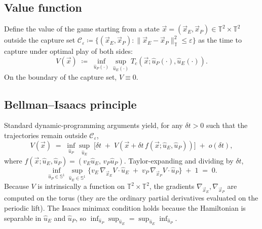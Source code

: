 \documentclass[11pt]{article}
\newcommand{\xE}{\vec{x}_E}
\newcommand{\xP}{\vec{x}_P}
\newcommand{\uE}{\hat{u}_E}
\newcommand{\uP}{\hat{u}_P}
\newcommand{\TT}{\mathbb{T}^{2}}
\begin{document}
\subsection{Value function}
Define the value of the game starting from a state
$\vec{x} = (\xE,\xP)\in\TT\times\TT$ outside the capture set
$\mathcal{C}_\varepsilon\coloneqq \{(\xE,\xP):\|\xE-\xP\|_\TT\le\varepsilon\}$
as the time to capture under optimal play of both sides:
\begin{equation}
V(\vec{x})
\;\coloneqq\;
\inf_{\uP(\cdot)} \sup_{\uE(\cdot)}
T_c(\vec{x};\uP(\cdot),\uE(\cdot)).
\end{equation}
On the boundary of the capture set, $V \equiv 0$.

\subsection{Bellman--Isaacs principle}
Standard dynamic-programming arguments \citep{evans1984differential,
basar1999dynamic} yield, for any $\delta t>0$ such that the trajectories
remain outside $\mathcal{C}_\varepsilon$,
\begin{equation}
V(\vec{x})
\;=\;
\inf_{\uP}\sup_{\uE}
\;
\big[\delta t \;+\; V(\vec{x}+\delta t\,f(\vec{x};\uE,\uP))\big]
\;+\; o(\delta t),
\end{equation}
where $f(\vec{x};\uE,\uP) = (v_E \uE,\,v_P \uP)$.  Taylor-expanding and
dividing by $\delta t$,
\begin{equation}
\label{eq:HJI-pre}
\inf_{\uP\in\mathbb{S}^1}\sup_{\uE\in\mathbb{S}^1}
\bigl\{
v_E\,\nabla_{\xE}V\cdot\uE
\;+\;
v_P\,\nabla_{\xP}V\cdot\uP
\bigr\}
\;+\; 1
\;=\; 0.
\end{equation}
Because $V$ is intrinsically a function on $\TT\times\TT$, the gradients
$\nabla_{\xE},\nabla_{\xP}$ are computed on the torus (they are the
ordinary partial derivatives evaluated on the periodic lift).
The Isaacs minimax condition holds because the Hamiltonian is separable
in $\uE$ and $\uP$, so $\inf_{\uP}\sup_{\uE} = \sup_{\uE}\inf_{\uP}$.
\end{document}
